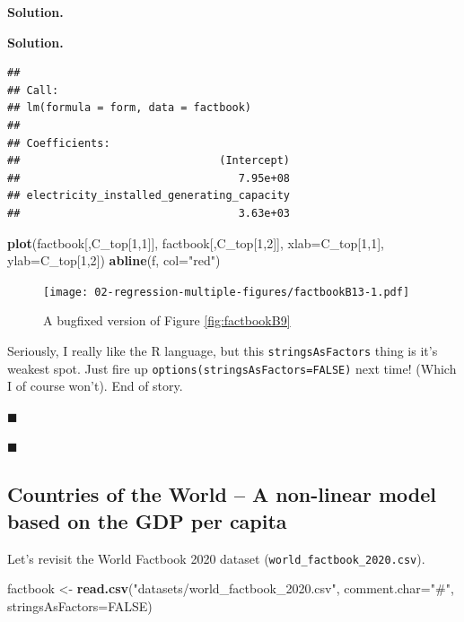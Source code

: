\documentclass[10pt,b5paper,krantz1]{krantz}
\newenvironment{Shaded}{\begin{snugshade}}{\end{snugshade}}
\newcommand{\DataTypeTok}[1]{\textcolor[rgb]{0.27,0.27,0.27}{#1}}
\newcommand{\DecValTok}[1]{\textcolor[rgb]{0.06,0.06,0.06}{#1}}
\newcommand{\KeywordTok}[1]{\textcolor[rgb]{0.27,0.27,0.27}{\textbf{#1}}}
\newcommand{\NormalTok}[1]{#1}
\newcommand{\OtherTok}[1]{\textcolor[rgb]{0.37,0.37,0.37}{#1}}
\newcommand{\StringTok}[1]{\textcolor[rgb]{0.5,0.5,0.5}{#1}}
\newenvironment{solution}{%
\bigskip\noindent\textbf{Solution. }%
\it\ignorespaces%
\ignorespaces%
}{\ignorespaces%
\hfill$\blacksquare$%
}
\begin{document}
\begin{solution}
\begin{solution}
\begin{verbatim}
## 
## Call:
## lm(formula = form, data = factbook)
## 
## Coefficients:
##                               (Intercept)  
##                                  7.95e+08  
## electricity_installed_generating_capacity  
##                                  3.63e+03
\end{verbatim}

\begin{Shaded}
\begin{Highlighting}[]
\KeywordTok{plot}\NormalTok{(factbook[,C_top[}\DecValTok{1}\NormalTok{,}\DecValTok{1}\NormalTok{]], factbook[,C_top[}\DecValTok{1}\NormalTok{,}\DecValTok{2}\NormalTok{]],}
    \DataTypeTok{xlab=}\NormalTok{C_top[}\DecValTok{1}\NormalTok{,}\DecValTok{1}\NormalTok{], }\DataTypeTok{ylab=}\NormalTok{C_top[}\DecValTok{1}\NormalTok{,}\DecValTok{2}\NormalTok{])}
\KeywordTok{abline}\NormalTok{(f, }\DataTypeTok{col=}\StringTok{"red"}\NormalTok{)}
\end{Highlighting}
\end{Shaded}

\begin{figure}
\hypertarget{fig:factbookB13}{%
\centering
\texttt{[image: 02-regression-multiple-figures/factbookB13-1.pdf]}
\caption{A bugfixed version of Figure \ref{fig:factbookB9}}\label{fig:factbookB13}
}
\end{figure}

Seriously, I really like the R language, but this \texttt{stringsAsFactors}
thing is it's weakest spot. Just fire up \texttt{options(stringsAsFactors=FALSE)}
next time! (Which I of course won't). End of story.

\end{solution}

\end{solution}

\hypertarget{countries-of-the-world-a-non-linear-model-based-on-the-gdp-per-capita}{%
\subsection{Countries of the World -- A non-linear model based on the GDP per capita}\label{countries-of-the-world-a-non-linear-model-based-on-the-gdp-per-capita}}

Let's revisit the World Factbook 2020 dataset (\texttt{world\_factbook\_2020.csv}).

\begin{Shaded}
\begin{Highlighting}[]
\NormalTok{factbook <-}\StringTok{ }\KeywordTok{read.csv}\NormalTok{(}\StringTok{"datasets/world_factbook_2020.csv"}\NormalTok{,}
    \DataTypeTok{comment.char=}\StringTok{"#"}\NormalTok{, }\DataTypeTok{stringsAsFactors=}\OtherTok{FALSE}\NormalTok{)}
\end{Highlighting}
\end{Shaded}
\end{document}
